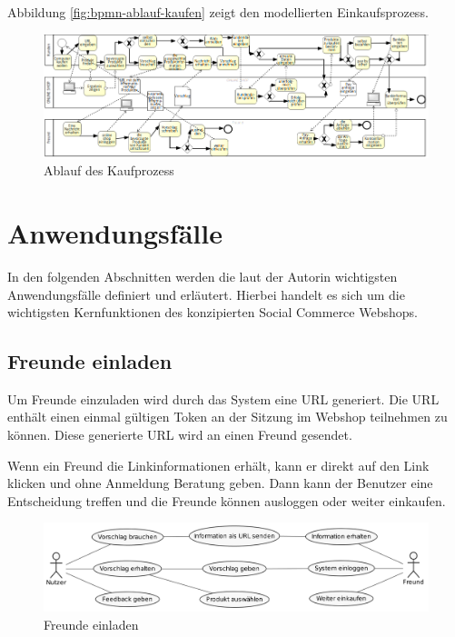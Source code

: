 Abbildung \vref{fig:bpmn-ablauf-kaufen} zeigt den modellierten Einkaufsprozess.

\begin{figure}[htbp]
	\centering
	\includegraphics[width=1\textwidth]{bilder/bpmn-ablauf-kaufen.png}
	\caption{Ablauf des Kaufprozess}
	\label{fig:bpmn-ablauf-kaufen}
\end{figure}


\section{Anwendungsfälle}

In den folgenden Abschnitten werden die laut der Autorin wichtigsten Anwendungsfälle definiert und erläutert. Hierbei handelt es sich um die wichtigsten Kernfunktionen des konzipierten Social Commerce Webshops.


\subsection{Freunde einladen}

Um Freunde einzuladen wird durch das System eine URL generiert. Die URL enthält einen einmal gültigen Token an der Sitzung im Webshop teilnehmen zu können. Diese generierte URL wird an einen Freund gesendet.

Wenn ein Freund die Linkinformationen erhält, kann er direkt auf den Link klicken und ohne Anmeldung Beratung geben. Dann kann der Benutzer eine Entscheidung treffen und die Freunde können ausloggen oder weiter einkaufen.

\begin{figure}[htbp]
	\centering
	\includegraphics[width=1\textwidth]{uml-diagramme/freunde-einladen.png}
	\caption{Freunde einladen}
	\label{fig:freunde-einladen}
\end{figure}


